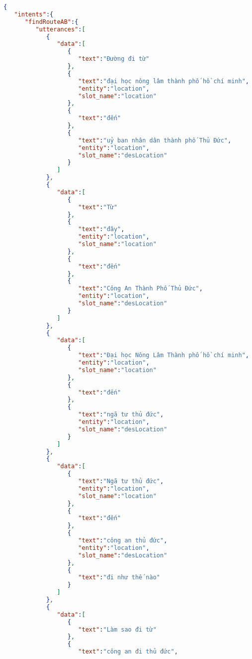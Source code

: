 \UseRawInputEncoding
\begin{lstlisting}[language=json,firstnumber=1]
{
   "intents":{
      "findRouteAB":{
         "utterances":[
            {
               "data":[
                  {
                     "text":"Đường đi từ"
                  },
                  {
                     "text":"đại học nông lâm thành phố hồ chí minh",
                     "entity":"location",
                     "slot_name":"location"
                  },
                  {
                     "text":"đến"
                  },
                  {
                     "text":"uỷ ban nhân dân thành phố Thủ Đức",
                     "entity":"location",
                     "slot_name":"desLocation"
                  }
               ]
            },
            {
               "data":[
                  {
                     "text":"Từ"
                  },
                  {
                     "text":"đây",
                     "entity":"location",
                     "slot_name":"location"
                  },
                  {
                     "text":"đến"
                  },
                  {
                     "text":"Công An Thành Phố Thủ Đức",
                     "entity":"location",
                     "slot_name":"desLocation"
                  }
               ]
            },
            {
               "data":[
                  {
                     "text":"Đại học Nông Lâm Thành phố hồ chí minh",
                     "entity":"location",
                     "slot_name":"location"
                  },
                  {
                     "text":"đến"
                  },
                  {
                     "text":"ngã tư thủ đức",
                     "entity":"location",
                     "slot_name":"desLocation"
                  }
               ]
            },
            {
               "data":[
                  {
                     "text":"Ngã tư thủ đức",
                     "entity":"location",
                     "slot_name":"location"
                  },
                  {
                     "text":"đến"
                  },
                  {
                     "text":"công an thủ đức",
                     "entity":"location",
                     "slot_name":"desLocation"
                  },
                  {
                     "text":"đi như thế nào"
                  }
               ]
            },
            {
               "data":[
                  {
                     "text":"Làm sao đi từ"
                  },
                  {
                     "text":"công an đi thủ đức",

\end{lstlisting}
